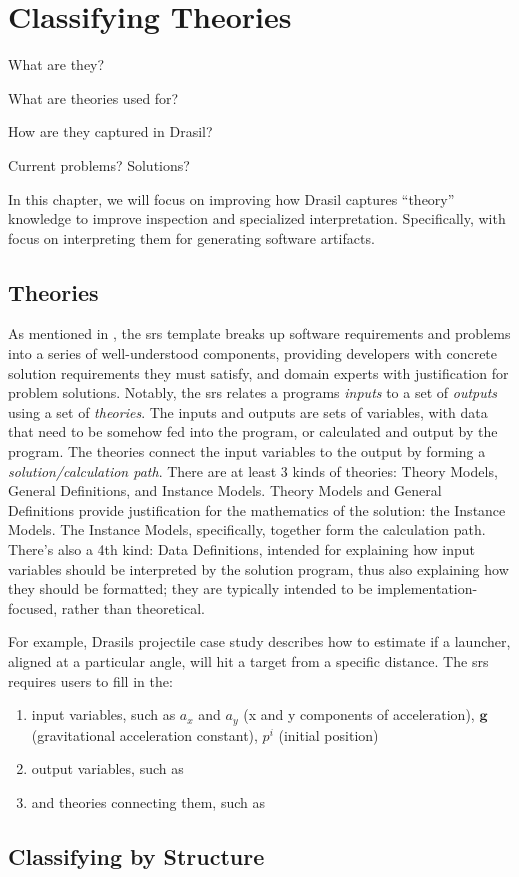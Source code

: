 \chapter*{Classifying Theories}
\label{chap:framing-theories}

\begin{writingdirectives}
    \item What are they?
    \item What are theories used for?
    \item How are they captured in Drasil?
    \item Current problems? Solutions?
\end{writingdirectives}

In this chapter, we will focus on improving how Drasil captures ``theory''
knowledge to improve inspection and specialized interpretation. Specifically,
with focus on interpreting them for generating software artifacts.

\section{Theories}
\label{chap:framing-theories:sec:theories}

As mentioned in , the \acs{srs} template
\cite{SmithAndLai2005} breaks up software requirements and problems into a
series of well-understood components, providing developers with concrete
solution requirements they must satisfy, and domain experts with justification
for problem solutions. Notably, the \acs{srs} relates a programs \textit{inputs}
to a set of \textit{outputs} using a set of \textit{theories}. The inputs and
outputs are sets of variables, with data that need to be somehow fed into the
program, or calculated and output by the program. The theories connect the input
variables to the output by forming a \textit{solution/calculation path}. There
are at least 3 kinds of theories: Theory Models, General Definitions, and
Instance Models. Theory Models and General Definitions provide justification for
the mathematics of the solution: the Instance Models. The Instance Models,
specifically, together form the calculation path. There's also a 4th kind: Data
Definitions, intended for explaining how input variables should be interpreted
by the solution program, thus also explaining how they should be formatted; they
are typically intended to be implementation-focused, rather than theoretical.

For example, Drasils \acs{projectile} case study describes how to estimate if a
launcher, aligned at a particular angle, will hit a target from a specific
distance. The \acs{srs} requires users to fill in the:
\begin{enumerate}
    \item input variables, such as \(a_x\) and \(a_y\) (x and y components of
          acceleration), \(\mathbf{g}\) (gravitational acceleration constant),
          \(p^{i}\) (initial position)
    \item output variables, such as
    \item and theories connecting them, such as
\end{enumerate}

\section{Classifying by Structure}
\label{chap:framing-theories:sec:classifying-and-structuring}
